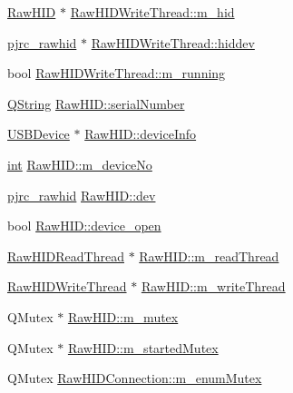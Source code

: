 \begin{DoxyCompactItemize}
\item 
\hyperlink{class_raw_h_i_d}{Raw\-H\-I\-D} $\ast$ \hyperlink{group___raw_h_i_d_plugin_ga753f0d79e5633e60df867fe7c35dd6e4}{Raw\-H\-I\-D\-Write\-Thread\-::m\-\_\-hid}
\item 
\hyperlink{classpjrc__rawhid}{pjrc\-\_\-rawhid} $\ast$ \hyperlink{group___raw_h_i_d_plugin_ga7ce382fd2ebb17e10007aed01dea1d6f}{Raw\-H\-I\-D\-Write\-Thread\-::hiddev}
\item 
bool \hyperlink{group___raw_h_i_d_plugin_gaf4f4725b8f0b6ed4b9b5c751397d0abe}{Raw\-H\-I\-D\-Write\-Thread\-::m\-\_\-running}
\item 
\hyperlink{group___u_a_v_objects_plugin_gab9d252f49c333c94a72f97ce3105a32d}{Q\-String} \hyperlink{group___raw_h_i_d_plugin_ga0b5d9bd4ac69612199afa5b59dfc3ed6}{Raw\-H\-I\-D\-::serial\-Number}
\item 
\hyperlink{class_u_s_b_device}{U\-S\-B\-Device} $\ast$ \hyperlink{group___raw_h_i_d_plugin_gab9b0f096459d4bc5a220ac42e9465752}{Raw\-H\-I\-D\-::device\-Info}
\item 
\hyperlink{ioapi_8h_a787fa3cf048117ba7123753c1e74fcd6}{int} \hyperlink{group___raw_h_i_d_plugin_ga0dde2d900a5f9cbd059e528de3f0c73b}{Raw\-H\-I\-D\-::m\-\_\-device\-No}
\item 
\hyperlink{classpjrc__rawhid}{pjrc\-\_\-rawhid} \hyperlink{group___raw_h_i_d_plugin_ga4939588bf5bf31e39139a75ca4319884}{Raw\-H\-I\-D\-::dev}
\item 
bool \hyperlink{group___raw_h_i_d_plugin_ga6ec3ad7c063679816e5aafed60f677c3}{Raw\-H\-I\-D\-::device\-\_\-open}
\item 
\hyperlink{class_raw_h_i_d_read_thread}{Raw\-H\-I\-D\-Read\-Thread} $\ast$ \hyperlink{group___raw_h_i_d_plugin_gaecb703f979aac429ee3961f52c998b53}{Raw\-H\-I\-D\-::m\-\_\-read\-Thread}
\item 
\hyperlink{class_raw_h_i_d_write_thread}{Raw\-H\-I\-D\-Write\-Thread} $\ast$ \hyperlink{group___raw_h_i_d_plugin_ga103f382a48fee4b9fe034b3d88f45d42}{Raw\-H\-I\-D\-::m\-\_\-write\-Thread}
\item 
Q\-Mutex $\ast$ \hyperlink{group___raw_h_i_d_plugin_ga915d676c812135bc006e37a140a52365}{Raw\-H\-I\-D\-::m\-\_\-mutex}
\item 
Q\-Mutex $\ast$ \hyperlink{group___raw_h_i_d_plugin_ga62ee841aa1de86d73cfd1b9bc7a5d719}{Raw\-H\-I\-D\-::m\-\_\-started\-Mutex}
\item 
Q\-Mutex \hyperlink{group___raw_h_i_d_plugin_ga13d9bdfab2ab9e3a4f4cd08b53a2f105}{Raw\-H\-I\-D\-Connection\-::m\-\_\-enum\-Mutex}
\item 

\end{DoxyCompactItemize}
